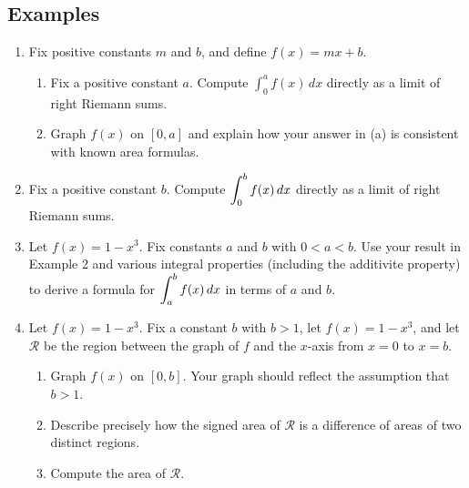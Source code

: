 \documentclass[11pt]{article}
\theoremstyle{definition}
\theoremstyle{named}
\numberwithin{myalgctr}{section}
\begin{document}
\subsection*{Examples}
\begin{enumerate}
    \item Fix positive constants $m$ and $b$, and define $f(x)=mx+b$.
    \begin{enumerate}
      \item Fix a positive constant $a$. Compute $\int_0^a f(x)\, dx$ directly as a limit of right Riemann sums.
      \item Graph $f(x)$ on $[0,a]$ and explain how your answer in (a) is consistent with known area formulas.
    \end{enumerate}
    \item Fix a positive constant $b$. Compute $\displaystyle\int_0^b f(x)\, dx$ directly as a limit of right Riemann sums.

  \item Let $f(x)=1-x^3$. Fix constants $a$ and $b$ with $0<a<b$. Use your result in Example 2 and various integral properties (including the  additivite property) to derive a formula for $\displaystyle\int_a^bf(x)\, dx$ in terms of $a$ and $b$.

  \item Let $f(x)=1-x^3$. Fix a constant $b$ with $b>1$, let $f(x)=1-x^3$, and let $\mathcal{R}$ be the region between the graph of $f$ and the $x$-axis from $x=0$ to $x=b$.
  \begin{enumerate}
    \item Graph $f(x)$ on $[0,b]$. Your graph should reflect the assumption that $b>1$.
    \item Describe precisely how the signed area of $\mathcal{R}$ is a difference of areas of two distinct regions.
    \item Compute the area of $\mathcal{R}$.
  \end{enumerate}
\end{enumerate}
\end{document}
